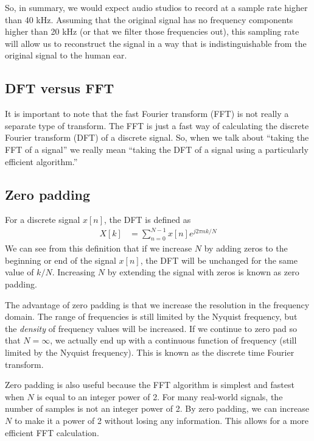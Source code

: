 \documentclass[twocolumn]{myarticle}
\begin{document}
So, in summary, we would expect audio studios to record at a sample rate higher than 40 kHz.
Assuming that the original signal has no frequency components higher than 20 kHz (or that we filter those frequencies out), this sampling rate will allow us to reconstruct the signal in a way that is indistinguishable from the original signal to the human ear.

\subsection{DFT versus FFT}
\label{subsec:dft_versus_fft}

It is important to note that the fast Fourier transform (FFT) is not really a separate type of transform.
The FFT is just a fast way of calculating the discrete Fourier transform (DFT) of a discrete signal.
So, when we talk about ``taking the FFT of a signal'' we really mean ``taking the DFT of a signal using a particularly efficient algorithm.''

\subsection{Zero padding}
\label{subsec:zero_padding}

For a discrete signal $ x[n] $, the DFT is defined as
\begin{align}
    X[k] &= \sum_{n = 0}^{N-1} x[n] e^{j 2 \pi n k / N}
\end{align}
We can see from this definition that if we increase $ N $ by adding zeros to the beginning or end of the signal $ x[n] $, the DFT will be unchanged for the same value of $ k/N $.
Increasing $ N $ by extending the signal with zeros is known as zero padding.

The advantage of zero padding is that we increase the resolution in the frequency domain.
The range of frequencies is still limited by the Nyquist frequency, but the \emph{density} of frequency values will be increased.
If we continue to zero pad so that $ N = \infty $, we actually end up with a continuous function of frequency (still limited by the Nyquist frequency).
This is known as the discrete time Fourier transform.

Zero padding is also useful because the FFT algorithm is simplest and fastest when $ N $ is equal to an integer power of 2.
For many real-world signals, the number of samples is not an integer power of 2.
By zero padding, we can increase $ N $ to make it a power of 2 without losing any information.
This allows for a more efficient FFT calculation.
\end{document}
